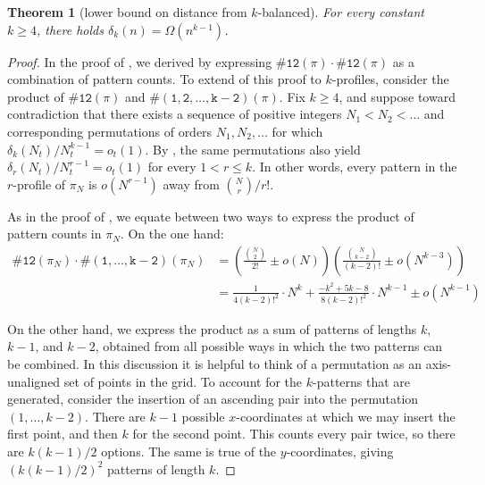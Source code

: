 \documentclass{article}
\newtheorem{theorem}{Theorem}[section]
\newcommand{\pc}[2]{{\# \mathtt{ #1 } \left( #2 \right)}}
\theoremstyle{remark}
\theoremstyle{plain}
\begin{document}
\begin{theorem} [lower bound on distance from $k$-balanced]
    \label{thm:lowerbound_distance}
    For every constant $k\geq 4$, there holds $\delta_k(n) = \Omega(n^{k-1})$.
\end{theorem}
\begin{proof}
In the proof of ,
we derived  by
expressing $\pc{12}{\pi} \cdot \pc{12}{\pi}$ as a combination of pattern counts.
To extend of this proof to $k$-profiles, consider 
the product of $\pc{12}{\pi}$ and $\pc{(1,2,\ldots,k-2)}{\pi}$. 
Fix $k \geq 4$, and suppose toward contradiction that
there exists a sequence of positive integers $N_1 < N_2 < \dots$ and corresponding
permutations of orders $N_1, N_2,\ldots$
for which $\delta_k(N_t)/N_t^{k-1} =o_t(1)$. By
, the same permutations also yield
$\delta_r(N_t)/N_t^{r-1} =o_t(1)$ for every 
$1 < r \leq k$.  In other words, every pattern in the $r$-profile of 
$\pi_N$ is $o(N^{r-1})$ away from $\binom{N}{r}/r!$.
    
As in the proof of , we equate between two ways to express
the product of pattern counts in $\pi_N$. On the one hand:
    \begin{align}
        \label{eq:12k_first}
        \pc{12}{\pi_N} \cdot \pc{(1,\ldots,k-2)}{\pi_N} &= \left( \frac{\binom{N}{2}}{2!} \pm o(N) \right) \left( \frac{\binom{N}{k-2}}{(k-2)!} \pm o(N^{k-3}) \right) \nonumber \\
        &= \frac{1}{4(k-2)!^2}\cdot N^k + \frac{-k^2+5k-8}{8(k-2)!^2} \cdot N^{k-1} \pm o(N^{k-1})
    \end{align}

    On the other hand, we express the product as a sum of patterns of lengths $k$, $k-1$, and $k-2$, obtained from all possible ways in which the two patterns can be combined. 
    In this discussion it is helpful to think of a permutation as an axis-unaligned set of points in the grid.
    To account for the $k$-patterns that are generated, consider the insertion of an ascending pair into the permutation $(1,\ldots,k-2)$. There are $k-1$ possible $x$-coordinates at which we may insert the first point, and then $k$ for the second point. This counts every pair twice, so there are $k(k-1)/2$ options. The same is true of the $y$-coordinates, giving $\left(k(k-1)/2\right)^2$ patterns of length $k$.


\end{proof}
\end{document}
